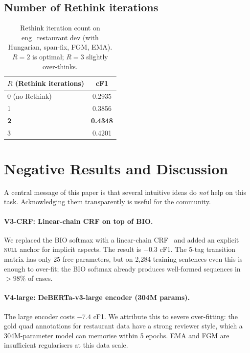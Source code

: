 \documentclass[runningheads]{llncs}
\begin{document}
\subsection{Number of Rethink iterations}

\begin{table}[htbp]
\centering\small
\caption{Rethink iteration count on eng\_restaurant dev (with
Hungarian, span-fix, FGM, EMA). $R{=}2$ is optimal; $R{=}3$
slightly over-thinks.}
\label{tab:rethink}
\begin{tabular}{lc}
\toprule
$R$ (Rethink iterations) & cF1 \\
\midrule
0 (no Rethink) & 0.2935 \\
1 & 0.3856 \\
\textbf{2} & \textbf{0.4348} \\
3 & 0.4201 \\
\bottomrule
\end{tabular}
\end{table}

\section{Negative Results and Discussion}
\label{sec:negative}

A central message of this paper is that several intuitive ideas do
\emph{not} help on this task. Acknowledging them transparently is
useful for the community.

\paragraph{V3-CRF: Linear-chain CRF on top of BIO.}
We replaced the BIO softmax with a linear-chain
CRF~\cite{lafferty2001crf} and added an explicit \textsc{null} anchor
for implicit aspects. The result is $-0.3$ cF1. The 5-tag transition
matrix has only $25$ free parameters, but on 2{,}284 training
sentences even this is enough to over-fit; the BIO softmax already
produces well-formed sequences in $\!>$$98\%$ of cases.

\paragraph{V4-large: DeBERTa-v3-large encoder (304M params).}
The large encoder costs $-7.4$ cF1. We attribute this to severe
over-fitting: the gold quad annotations for restaurant data have a
strong reviewer style, which a 304M-parameter model can memorise
within 5 epochs. EMA and FGM are insufficient regularisers at this
data scale.
\end{document}
